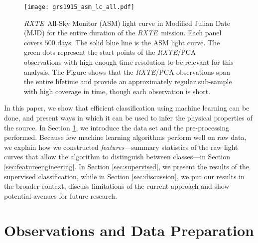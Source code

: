 \documentclass[fleqn,usenatbib]{mnras}
\newcommand{\project}[1]{\textsl{#1}}
\newcommand{\rxte}{\project{RXTE}}
\begin{document}
\begin{figure}
\begin{center}
\texttt{[image: grs1915\_asm\_lc\_all.pdf]}
\caption{\rxte\ All-Sky Monitor (ASM) light curve in Modified Julian Date (MJD) for the entire duration of the \rxte\ mission. Each panel covers $500$ days. The solid blue line is the ASM light curve. The green dots represent the start points of the \rxte/PCA observations with high enough time resolution to be relevant for this analysis. The Figure shows that the \rxte/PCA observations span the entire lifetime and provide an approximately regular sub-sample with high coverage in time, though each observation is short.}
\label{fig:asm_total}
\end{center}
\end{figure}

In this paper, we show that efficient classification using machine learning can be done, and present ways in which it can be used to infer the physical properties of the source. In Section \ref{sec:observations}, we introduce the data set and the pre-processing performed. Because few machine learning algorithms perform well on raw data, we explain how we constructed \textit{features}---summary statistics of the raw light curves that allow the algorithm to distinguish between classes---in Section \ref{sec:featureengineering}. In Section \ref{sec:supervised}, we present the results of the supervised classification, while in Section \ref{sec:discussion}, we put our 
results in the broader context, discuss limitations of the current approach and show potential avenues for future research.

\section{Observations and Data Preparation}
\label{sec:observations}
\end{document}
